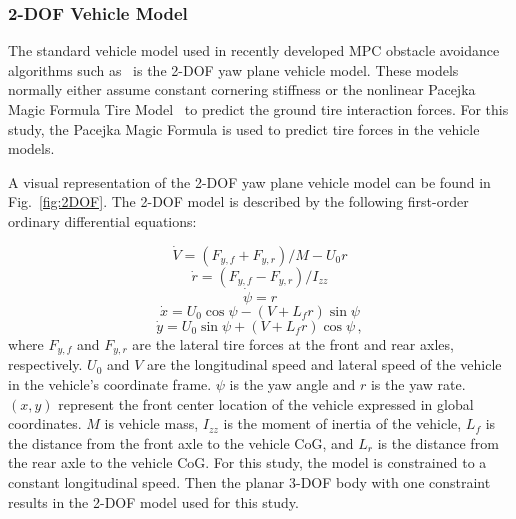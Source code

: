 \documentclass[12pt,onecolumn]{article}
\begin{document}

\subsubsection{2-DOF Vehicle Model}\label{sss:2DOFModel}
The standard vehicle model used in recently developed MPC obstacle avoidance algorithms such as~\cite{ModelFidelity2016} is the 2-DOF yaw plane vehicle model. These models normally either assume constant cornering stiffness or the nonlinear Pacejka Magic Formula Tire Model~\cite{Pacejka1997} to predict the ground tire interaction forces. For this study, the Pacejka Magic Formula is used to predict tire forces in the vehicle models.   

A visual representation of the 2-DOF yaw plane vehicle model can be found in Fig.~\ref{fig:2DOF}. The 2-DOF model is described by the following first-order ordinary differential equations:

\begin{equation}\label{e:2DOF_Vdot}
\dot{V} = \left(F_{y,f} + F_{y,r}\right)/{M - U_0r} 
\end{equation}
\begin{equation}\label{e:2DOF_rdot}
\dot{r} = \left(F_{y,f} - F_{y,r}\right)/I_{zz}
\end{equation}
\begin{equation}\label{e:2DOF_psidot}
\dot{\psi} = r 
\end{equation}
\begin{equation}\label{e:2DOF_xdot}
\dot{x} = U_0\cos{\psi}-\left(V+L_fr\right)\sin{\psi}
\end{equation}
\begin{equation}\label{e:2DOF_ydot}
\dot{y} = U_0\sin{\psi}+\left(V+L_fr\right)\cos{\psi} \,,
\end{equation}
%
where $F_{y,f}$ and $F_{y,r}$ are the lateral tire forces at the front and rear axles, respectively. $U_0$ and $V$ are the longitudinal speed and lateral speed of the vehicle in the vehicle's coordinate frame. $\psi$ is the yaw angle and $r$ is the yaw rate. $\left(x,y\right)$ represent the front center location of the vehicle expressed in global coordinates. $M$ is vehicle mass, $I_{zz}$ is the moment of inertia of the vehicle, $L_f$ is the distance from the front axle to the vehicle CoG, and $L_r$ is the distance from the rear axle to the vehicle CoG. For this study, the model is constrained to a constant longitudinal speed. Then the planar 3-DOF body with one constraint results in the 2-DOF model used for this study.
\end{document}
